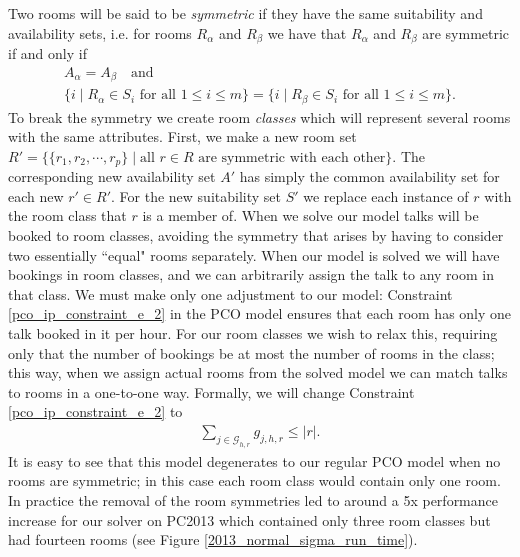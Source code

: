 \documentclass[]{article}
\theoremstyle{definition}
\theoremstyle{remark}
\numberwithin{equation}{section}
\begin{document}
Two rooms will be said to be \emph{symmetric} if they have the same suitability and availability sets, i.e. for rooms $R_\alpha$ and $R_\beta$ we have that $R_\alpha$ and $R_\beta$ are symmetric if and only if
\begin{gather*}
	A_\alpha = A_\beta \quad \text{and} \\
	\{i \; | \; R_\alpha \in S_i \text{ for all } 1 \le i \le m\} = \{i \; | \; R_\beta \in S_i \text{ for all } 1 \le i \le m\}.
\end{gather*}
To break the symmetry we create room \emph{classes} which will represent several rooms with the same attributes. First, we make a new room set $R' = \{ \{r_1, r_2, \cdots, r_p \} \; | \; \text{all } r \in R \text{ are symmetric with each other} \}$. The corresponding new availability set $A'$ has simply the common availability set for each new $r' \in R'$. For the new suitability set $S'$ we replace each instance of $r$ with the room class that $r$ is a member of. When we solve our model talks will be booked to room classes, avoiding the symmetry that arises by having to consider two essentially ``equal" rooms separately. When our model is solved we will have bookings in room classes, and we can arbitrarily assign the talk to any room in that class. We must make only one adjustment to our model: Constraint \ref{pco_ip_constraint_e_2} in the PCO model ensures that each room has only one talk booked in it per hour. For our room classes we wish to relax this, requiring only that the number of bookings be at most the number of rooms in the class; this way, when we assign actual rooms from the solved model we can match talks to rooms in a one-to-one way. Formally, we will change Constraint \ref{pco_ip_constraint_e_2} to
\begin{gather}
	\sum_{j \in \mathcal G_{h,r}} g_{j,h,r} \le |r|.
\end{gather}
It is easy to see that this model degenerates to our regular PCO model when no rooms are symmetric; in this case each room class would contain only one room. In practice the removal of the room symmetries led to around a 5x performance increase for our solver on PC2013 which contained only three room classes but had fourteen rooms (see Figure \ref{2013_normal_sigma_run_time}). 
\end{document}
